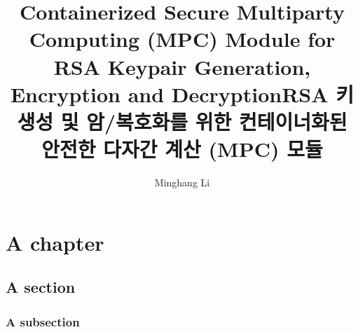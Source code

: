 \documentclass[11pt]{report}
\title{Containerized Secure Multiparty Computing (MPC) Module for RSA Keypair Generation, Encryption and Decryption}
\title*{RSA 키생성 및 암/복호화를 위한 컨테이너화된 안전한 다자간 계산 (MPC) 모듈}
\author{Minghang Li}
\begin{document}


\pagebreak



\pagebreak



\pagebreak

\tableofcontents
\thispagestyle{empty}

\pagebreak

\setcounter{page}{1}

\chapter{A chapter}

\section{A section}

\subsection{A subsection}

\pagebreak



\pagebreak


\end{document}

